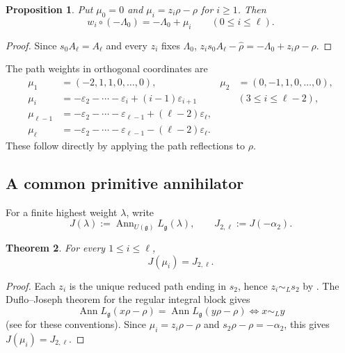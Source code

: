 \documentclass[11pt]{amsart}
\newtheorem{theorem}{Theorem}[section]
\newtheorem{proposition}[theorem]{Proposition}
\theoremstyle{remark}
\numberwithin{equation}{section}
\begin{document}
\begin{proposition}
\label{prop:path-dot-action}
Put \(\mu_0=0\) and \(\mu_i=z_i\rho-\rho\) for \(i\ge1\).  Then
\[
   w_i\circ(-\Lambda_0)=-\Lambda_0+\mu_i
   \qquad(0\le i\le\ell).
\]
\end{proposition}

\begin{proof}
Since \(s_0A_\ell=A_\ell\) and every \(z_i\) fixes \(\Lambda_0\),
\(z_i s_0A_\ell-\widehat\rho=-\Lambda_0+z_i\rho-\rho\).
\end{proof}

The path weights in orthogonal coordinates are
\begin{align}
 \mu_1&=(-2,1,1,0,\ldots,0),
 &\mu_2&=(0,-1,1,0,\ldots,0),\\
 \mu_i&=-\varepsilon_2-\cdots-\varepsilon_i+(i-1)\varepsilon_{i+1}
 &&(3\le i\le\ell-2),\\
 \mu_{\ell-1}&=-\varepsilon_2-\cdots-\varepsilon_{\ell-1}
                 +(\ell-2)\varepsilon_\ell,\\
 \mu_\ell&=-\varepsilon_2-\cdots-\varepsilon_{\ell-1}
                 -(\ell-2)\varepsilon_\ell.
\end{align}
These follow directly by applying the path reflections to \(\rho\).

\subsection{A common primitive annihilator}
\label{subsec:primitive-compression}

For a finite highest weight \(\lambda\), write
\[
   J(\lambda):=\operatorname{Ann}_{U(\mathfrak g)}L_{\mathfrak g}(\lambda),
   \qquad
   J_{2,\ell}:=J(-\alpha_2).
\]

\begin{theorem}
\label{thm:primitive-annihilator-compression}
For every \(1\le i\le\ell\),
\[
   J(\mu_i)=J_{2,\ell}.
\]
\end{theorem}

\begin{proof}
Each \(z_i\) is the unique reduced path ending in \(s_2\), hence
\(z_i\sim_Ls_2\) by \cite[Proposition~3.6]{Xu2019}.  The Duflo--Joseph
theorem for the regular integral block gives
\[
 \operatorname{Ann}L_{\mathfrak g}(x\rho-\rho)
 =\operatorname{Ann}L_{\mathfrak g}(y\rho-\rho)
 \iff x\sim_Ly
\]
(see \cite[Theorem~2.3.3(i)]{ShanYanZhao2026} for these conventions).
Since \(\mu_i=z_i\rho-\rho\) and \(s_2\rho-\rho=-\alpha_2\), this gives
\(J(\mu_i)=J_{2,\ell}\).
\end{proof}
\end{document}
